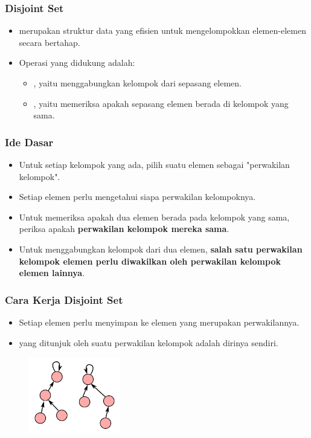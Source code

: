 \begin{frame}
\frametitle{Disjoint Set}
\begin{itemize}
  \item \pDjs merupakan struktur data yang efisien untuk mengelompokkan elemen-elemen secara bertahap.
  \item Operasi yang didukung adalah:
  \begin{itemize}
    \item {}, yaitu menggabungkan kelompok dari sepasang elemen.
    \item {}, yaitu memeriksa apakah sepasang elemen berada di kelompok yang sama.
  \end{itemize}
\end{itemize}
\end{frame}

\begin{frame}
\frametitle{Ide Dasar}
\begin{itemize}
  \item Untuk setiap kelompok yang ada, pilih suatu elemen sebagai "perwakilan kelompok".
  \item Setiap elemen perlu mengetahui siapa perwakilan kelompoknya.
  \item Untuk memeriksa apakah dua elemen berada pada kelompok yang sama, periksa apakah \textbf{perwakilan kelompok mereka sama}.
  \item Untuk menggabungkan kelompok dari dua elemen, \textbf{salah satu perwakilan kelompok elemen perlu diwakilkan oleh perwakilan kelompok elemen lainnya}.
\end{itemize}
\end{frame}

\begin{frame}
\frametitle{Cara Kerja Disjoint Set}
\begin{itemize}
  \item Setiap elemen perlu menyimpan  ke elemen yang merupakan perwakilannya.
  \item {} yang ditunjuk oleh suatu perwakilan kelompok adalah dirinya sendiri.
\end{itemize}
\begin{figure}
  \includegraphics[width=4cm]{asset/djs.pdf}
\end{figure}
\end{frame}

